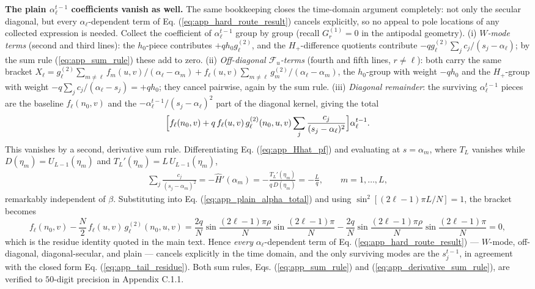 \documentclass[superscriptaddress, amsmath, amssymb, aps, pre, floatfix]{revtex4-2}
\begin{document}
\medskip
\noindent\textbf{The plain \(\alpha_\ell^{t-1}\) coefficients vanish as well.}
The same bookkeeping closes the time-domain argument completely: not only the secular diagonal, but every \(\alpha_\ell\)-dependent term of Eq. (\ref{eq:app_hard_route_result}) cancels explicitly, so no appeal to pole locations of any collected expression is needed.  Collect the coefficient of \(\alpha_\ell^{t-1}\) group by group (recall \(G^{(1)}_r=0\) in the antipodal geometry).
(i) \emph{\(W\)-mode terms} (second and third lines): the \(h_0\)-piece contributes \(+q h_0 g^{(2)}_\ell\), and the \(H_+\)-difference quotients contribute \(-q g^{(2)}_\ell\sum_jc_j/(s_j-\alpha_\ell)\); by the sum rule (\ref{eq:app_sum_rule}) these add to zero.
(ii) \emph{Off-diagonal \(\mathcal F_u\)-terms} (fourth and fifth lines, \(r\neq\ell\)): both carry the same bracket
\(X_\ell=g^{(2)}_\ell\sum_{m\neq\ell}f_m(u,v)/(\alpha_\ell-\alpha_m)+f_\ell(u,v)\sum_{m\neq\ell}g^{(2)}_m/(\alpha_\ell-\alpha_m)\),
the \(h_0\)-group with weight \(-qh_0\) and the \(H_+\)-group with weight \(-q\sum_jc_j/(\alpha_\ell-s_j)=+qh_0\); they cancel pairwise, again by the sum rule.
(iii) \emph{Diagonal remainder}: the surviving \(\alpha_\ell^{t-1}\) pieces are the baseline \(f_\ell(n_0,v)\) and the \(-\alpha_\ell^{t-1}/(s_j-\alpha_\ell)^2\) part of the diagonal kernel, giving the total
\begin{align}
  \Bigl[f_\ell(n_0,v)+q\,f_\ell(u,v)\,g^{(2)}_\ell(n_0,u,v)\sum_j\frac{c_j}{(s_j-\alpha_\ell)^2}\Bigr]\alpha_\ell^{t-1}.
  \label{eq:app_plain_alpha_total}
\end{align}
This vanishes by a second, derivative sum rule.  Differentiating Eq. (\ref{eq:app_Hhat_pf}) and evaluating at \(s=\alpha_m\), where \(T_L\) vanishes while \(D(\eta_m)=U_{L-1}(\eta_m)\) and \(T_L'(\eta_m)=L\,U_{L-1}(\eta_m)\),
\begin{align}
  \sum_j\frac{c_j}{(s_j-\alpha_m)^2}
  =-\widehat H'(\alpha_m)
  =-\frac{T_L'(\eta_m)}{q\,D(\eta_m)}
  =-\frac{L}{q},
  \qquad m=1,\ldots,L,
  \label{eq:app_derivative_sum_rule}
\end{align}
remarkably independent of \(\beta\).  Substituting into Eq. (\ref{eq:app_plain_alpha_total}) and using \(\sin^2[(2\ell-1)\pi L/N]=1\), the bracket becomes
\[
  f_\ell(n_0,v)-\frac{N}{2}\,f_\ell(u,v)\,g^{(2)}_\ell(n_0,u,v)
  =\frac{2q}{N}\sin\frac{(2\ell-1)\pi\rho}{N}\sin\frac{(2\ell-1)\pi}{N}
  -\frac{2q}{N}\sin\frac{(2\ell-1)\pi\rho}{N}\sin\frac{(2\ell-1)\pi}{N}=0 ,
\]
which is the residue identity quoted in the main text.  Hence \emph{every} \(\alpha_\ell\)-dependent term of Eq. (\ref{eq:app_hard_route_result}) --- \(W\)-mode, off-diagonal, diagonal-secular, and plain --- cancels explicitly in the time domain, and the only surviving modes are the \(s_j^{t-1}\), in agreement with the closed form Eq. (\ref{eq:app_tail_residue}).  Both sum rules, Eqs. (\ref{eq:app_sum_rule}) and (\ref{eq:app_derivative_sum_rule}), are verified to \(50\)-digit precision in Appendix C.1.1.
\end{document}
